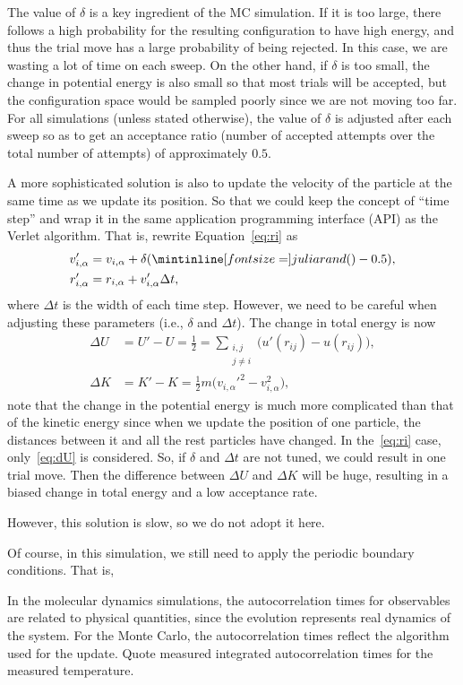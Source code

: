 The value of \(\delta\) is a key
ingredient of the MC simulation. If it is too large, there follows a high probability
for the resulting configuration to have high energy, and thus the trial move has a
large probability of being rejected.
In this case, we are wasting a lot of time on each sweep.
On the other hand, if \(\delta\) is too small, the change in
potential energy is also small so that most trials will be accepted, but the configuration
space would be sampled poorly since we are not moving too far.
For all simulations (unless stated otherwise), the
value of \(\delta\) is adjusted after each sweep so as to get an acceptance ratio (number of
accepted attempts over the total number of attempts) of approximately \(0.5\).

A more sophisticated solution is also to update the velocity of the particle
at the same time as we update its position. So that we could keep the concept of
``time step'' and wrap it in the same application programming interface (API)
as the Verlet algorithm.
That is, rewrite Equation~\eqref{eq:ri} as
%
\begin{align}
    v_{i, \alpha}' & = v_{i, \alpha} + \delta (\code{rand()} - 0.5), \\
    r_{i, \alpha}' & = r_{i, \alpha} + v_{i, \alpha}' \Delta t,
\end{align}
%
where \(\Delta t\) is the width of each time step.
However, we need to be careful when adjusting these parameters (i.e., \(\delta\) and
\(\Delta t\)). The change in total energy is now
%
\begin{align}
    \Delta U & = U' - U = \frac{1}{2} = \sum_{\substack{i, j \\ j \neq i}} \bigl(u'(r_{ij}) - u(r_{ij})\bigr),\label{eq:dU} \\
    \Delta K & = K' - K = \frac{1}{2} m \bigl(v_{i, \alpha}'^2 - v_{i, \alpha}^2\bigr),
\end{align}
%
note that the change in the potential energy is much more complicated than that of the
kinetic energy since when we update the position of one particle, the distances
between it and all the rest particles have changed.
In the~\eqref{eq:ri} case, only~\eqref{eq:dU} is considered.
So, if \(\delta\) and \(\Delta t\) are not tuned, we could result in one trial move.
Then the difference between \(\Delta U\) and \(\Delta K\) will be huge, resulting in a
biased change in total energy and a low acceptance rate.

However, this solution is slow, so we do not adopt it here.


Of course, in this simulation, we still need to apply the periodic boundary conditions.
That is,

\Question{}
In the molecular dynamics simulations, the autocorrelation times for observables are related
to physical quantities, since the evolution represents real dynamics of the system. For the
Monte Carlo, the autocorrelation times reflect the algorithm used for the update. Quote
measured integrated autocorrelation times for the measured temperature.

\Answer{}
